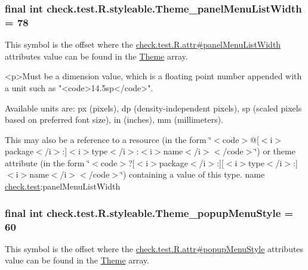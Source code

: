 \subsubsection[{Theme\+\_\+panel\+Menu\+List\+Width}]{\setlength{\rightskip}{0pt plus 5cm}final int check.\+test.\+R.\+styleable.\+Theme\+\_\+panel\+Menu\+List\+Width = 78\hspace{0.3cm}{\ttfamily [static]}}\label{classcheck_1_1test_1_1_r_1_1styleable_ac3385a441e77f588205019797ec7c36f}
This symbol is the offset where the \hyperlink{classcheck_1_1test_1_1_r_1_1attr_af36f49eda2d47bd95cb2012376a0547d}{check.\+test.\+R.\+attr\#panel\+Menu\+List\+Width} attribute\textquotesingle{}s value can be found in the \hyperlink{classcheck_1_1test_1_1_r_1_1styleable_acca726d02016a0cf607782ec3a436a81}{Theme} array.

\begin{DoxyVerb}      <p>Must be a dimension value, which is a floating point number appended with a unit such as "<code>14.5sp</code>".
\end{DoxyVerb}
 Available units are\+: px (pixels), dp (density-\/independent pixels), sp (scaled pixels based on preferred font size), in (inches), mm (millimeters). 

This may also be a reference to a resource (in the form \char`\"{}$<$code$>$@\mbox{[}$<$i$>$package$<$/i$>$\+:\mbox{]}$<$i$>$type$<$/i$>$\+:$<$i$>$name$<$/i$>$$<$/code$>$\char`\"{}) or theme attribute (in the form \char`\"{}$<$code$>$?\mbox{[}$<$i$>$package$<$/i$>$\+:\mbox{]}\mbox{[}$<$i$>$type$<$/i$>$\+:\mbox{]}$<$i$>$name$<$/i$>$$<$/code$>$\char`\"{}) containing a value of this type.  name \hyperlink{namespacecheck_1_1test}{check.\+test}\+:panel\+Menu\+List\+Width \hypertarget{classcheck_1_1test_1_1_r_1_1styleable_a84e7e01578f21a4c36f013d3e5d3b917}{}
\subsubsection[{Theme\+\_\+popup\+Menu\+Style}]{\setlength{\rightskip}{0pt plus 5cm}final int check.\+test.\+R.\+styleable.\+Theme\+\_\+popup\+Menu\+Style = 60\hspace{0.3cm}{\ttfamily [static]}}\label{classcheck_1_1test_1_1_r_1_1styleable_a84e7e01578f21a4c36f013d3e5d3b917}
This symbol is the offset where the \hyperlink{classcheck_1_1test_1_1_r_1_1attr_aba44c089874abc974a6e8827efcd53ea}{check.\+test.\+R.\+attr\#popup\+Menu\+Style} attribute\textquotesingle{}s value can be found in the \hyperlink{classcheck_1_1test_1_1_r_1_1styleable_acca726d02016a0cf607782ec3a436a81}{Theme} array.


